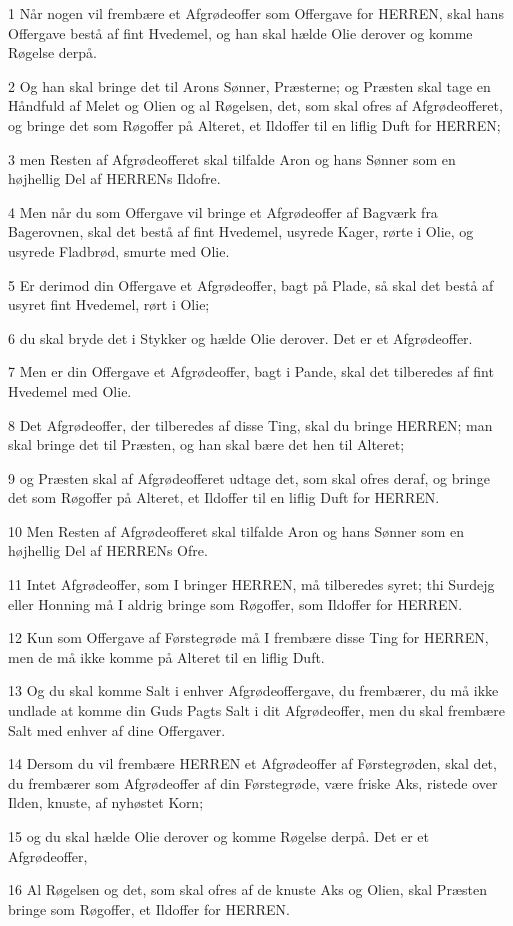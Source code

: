 \par 1 Når nogen vil frembære et Afgrødeoffer som Offergave for HERREN, skal hans Offergave bestå af fint Hvedemel, og han skal hælde Olie derover og komme Røgelse derpå.
\par 2 Og han skal bringe det til Arons Sønner, Præsterne; og Præsten skal tage en Håndfuld af Melet og Olien og al Røgelsen, det, som skal ofres af Afgrødeofferet, og bringe det som Røgoffer på Alteret, et Ildoffer til en liflig Duft for HERREN;
\par 3 men Resten af Afgrødeofferet skal tilfalde Aron og hans Sønner som en højhellig Del af HERRENs Ildofre.
\par 4 Men når du som Offergave vil bringe et Afgrødeoffer af Bagværk fra Bagerovnen, skal det bestå af fint Hvedemel, usyrede Kager, rørte i Olie, og usyrede Fladbrød, smurte med Olie.
\par 5 Er derimod din Offergave et Afgrødeoffer, bagt på Plade, så skal det bestå af usyret fint Hvedemel, rørt i Olie;
\par 6 du skal bryde det i Stykker og hælde Olie derover. Det er et Afgrødeoffer.
\par 7 Men er din Offergave et Afgrødeoffer, bagt i Pande, skal det tilberedes af fint Hvedemel med Olie.
\par 8 Det Afgrødeoffer, der tilberedes af disse Ting, skal du bringe HERREN; man skal bringe det til Præsten, og han skal bære det hen til Alteret;
\par 9 og Præsten skal af Afgrødeofferet udtage det, som skal ofres deraf, og bringe det som Røgoffer på Alteret, et Ildoffer til en liflig Duft for HERREN.
\par 10 Men Resten af Afgrødeofferet skal tilfalde Aron og hans Sønner som en højhellig Del af HERRENs Ofre.
\par 11 Intet Afgrødeoffer, som I bringer HERREN, må tilberedes syret; thi Surdejg eller Honning må I aldrig bringe som Røgoffer, som Ildoffer for HERREN.
\par 12 Kun som Offergave af Førstegrøde må I frembære disse Ting for HERREN, men de må ikke komme på Alteret til en liflig Duft.
\par 13 Og du skal komme Salt i enhver Afgrødeoffergave, du frembærer, du må ikke undlade at komme din Guds Pagts Salt i dit Afgrødeoffer, men du skal frembære Salt med enhver af dine Offergaver.
\par 14 Dersom du vil frembære HERREN et Afgrødeoffer af Førstegrøden, skal det, du frembærer som Afgrødeoffer af din Førstegrøde, være friske Aks, ristede over Ilden, knuste, af nyhøstet Korn;
\par 15 og du skal hælde Olie derover og komme Røgelse derpå. Det er et Afgrødeoffer,
\par 16 Al Røgelsen og det, som skal ofres af de knuste Aks og Olien, skal Præsten bringe som Røgoffer, et Ildoffer for HERREN.

